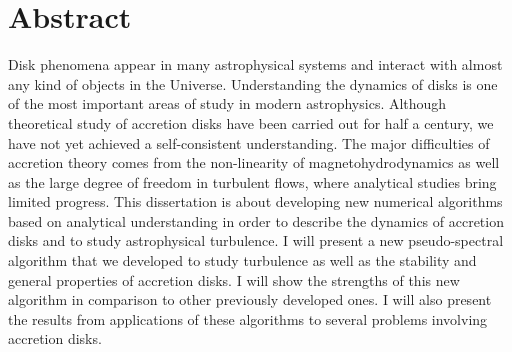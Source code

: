 \chapter*{Abstract}

Disk phenomena appear in many astrophysical systems and interact with
almost any kind of objects in the Universe.
Understanding the dynamics of disks is one of the most important areas
of study in modern astrophysics.
Although theoretical study of accretion disks have been carried out
for half a century, we have not yet achieved a self-consistent
understanding.
The major difficulties of accretion theory comes from the
non-linearity of magnetohydrodynamics as well as the large degree of
freedom in turbulent flows, where analytical studies bring limited
progress.
This dissertation is about developing new numerical algorithms based
on analytical understanding in order to describe the dynamics of
accretion disks and to study astrophysical turbulence.
I will present a new pseudo-spectral algorithm that we developed to
study turbulence as well as the stability and general properties of
accretion disks.
I will show the strengths of this new algorithm in comparison to other
previously developed ones.
I will also present the results from applications of these algorithms
to several problems involving accretion disks.
